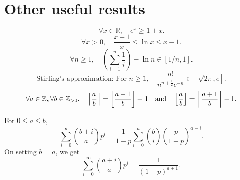 \documentclass[a4paper, 12pt, fleqn]{article}
\begin{document}
\section{Other useful results}

\[ \forall x \in \mathbb{R},\quad e^x \ge 1 + x. \]
\[ \forall x > 0, \quad \frac{x-1}{x} \le \ln x \le x-1. \]
\[ \forall n \ge 1, \quad \left(\sum_{i=1}^n \frac{1}{i}\right) - \ln n \in [1/n, 1]. \]
\[ \textrm{Stirling's approximation: For } n \ge 1,\quad
    \frac{n!}{n^{n+\frac{1}{2}}e^{-n}} \in [\sqrt{2\pi}, e]. \]
\[ \forall a \in \mathbb{\mathbb{Z}}, \forall b \in \mathbb{Z}_{>0},\quad
    \left\lceil \frac{a}{b} \right\rceil = \left\lfloor \frac{a-1}{b} \right\rfloor+1 \quad\textrm{and}\quad
    \left\lfloor \frac{a}{b} \right\rfloor = \left\lceil \frac{a+1}{b} \right\rceil-1. \]

\begin{theorem}
For $0 \le a \le b$,
\[ \sum_{i=0}^{\infty} \binom{b+i}{a}p^i
    = \frac{1}{1-p}\sum_{i=0}^a \binom{b}{i}\left(\frac{p}{1-p}\right)^{a-i}. \]
On setting $b = a$, we get
\[ \sum_{i=0}^{\infty} \binom{a+i}{a}p^i = \frac{1}{(1-p)^{a+1}}. \]
\end{theorem}

\end{document}
